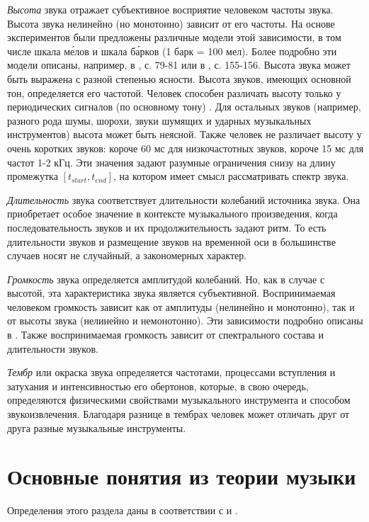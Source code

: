 \emph{Высота} звука отражает субъективное восприятие человеком частоты звука.
Высота звука нелинейно (но монотонно) зависит от его частоты. На основе
экспериментов были предложены различные модели этой зависимости, в том числе
шкала м\'{е}лов и шкала б\'{а}рков (1 барк = 100 мел). Более подробно эти модели
описаны, например, в \cite{Lerch2012}, с. 79-81 или в \cite{Aldoshina2006}, с.
155-156. Высота звука может быть выражена с разной степенью ясности. Высота
звуков, имеющих основной тон, определяется его частотой. Человек способен
различать высоту только у периодических сигналов (по основному тону)
\cite{Aldoshina2006}. Для остальных звуков (например, разного рода шумы, шорохи,
звуки шумящих и ударных музыкальных инструментов) высота может быть неясной.
Также человек не различает высоту у очень коротких звуков: короче 60 мс для
низкочастотных звуков, короче 15 мс для частот 1-2 кГц. Эти значения задают
разумные ограничения снизу на длину промежутка $[t_{start}, t_{end}]$, на
котором имеет смысл рассматривать спектр звука.

\emph{Длительность} звука соответствует длительности колебаний источника звука.
Она приобретает особое значение в контексте музыкального произведения, когда
последовательность звуков и их продолжительность задают ритм. То есть
длительности звуков и размещение звуков на временной оси в большинстве случаев
носят не случайный, а закономерных характер.

\emph{Громкость} звука определяется амплитудой колебаний. Но, как в случае с
высотой, эта характеристика звука является субъективной. Воспринимаемая
человеком громкость зависит как от амплитуды (нелинейно и монотонно), так и от
высоты звука (нелинейно и немонотонно). Эти зависимости подробно описаны в
\cite{Fastl2007}. Также воспринимаемая громкость зависит от спектрального
состава и длительности звуков.

\emph{Тембр} или окраска звука определяется частотами, процессами вступления и
затухания и интенсивностью его обертонов, которые, в свою очередь, определяются
физическими свойствами музыкального инструмента и способом звукоизвлечения.
Благодаря разнице в тембрах человек может отличать друг от друга разные
музыкальные инструменты.

\section{Основные понятия из теории музыки} \label{sectT_music}

Определения этого раздела даны в соответствии с \cite{Vahromeev1962} и
\cite{Sposobin2012}.

